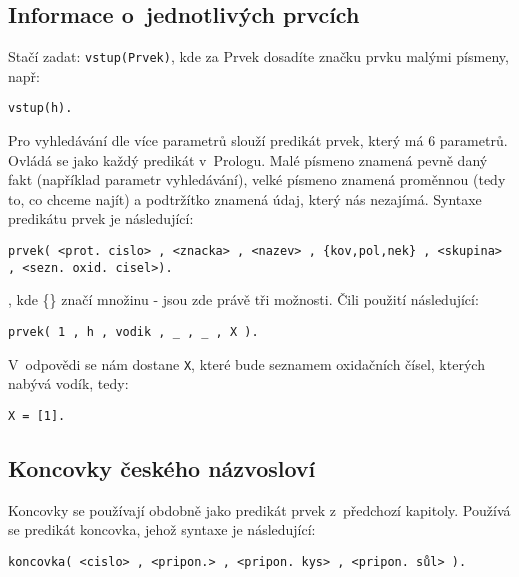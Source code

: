 \documentclass[a4paper]{article}
\begin{document}
\subsection{Informace o~jednotlivých prvcích}
Stačí zadat: \texttt{vstup(Prvek)}, kde za Prvek dosadíte značku prvku malými písmeny, např:
\begin{verbatim}
vstup(h).
\end{verbatim}
Pro vyhledávání dle více parametrů slouží predikát prvek, který má 6 parametrů. Ovládá se jako každý predikát v~Prologu. Malé písmeno znamená pevně daný fakt (například parametr vyhledávání), velké písmeno znamená proměnnou (tedy to, co chceme najít) a podtržítko znamená údaj, který nás nezajímá. Syntaxe predikátu prvek je následující:
\begin{verbatim}
prvek( <prot. cislo> , <znacka> , <nazev> , {kov,pol,nek} , <skupina> , <sezn. oxid. cisel>). 
\end{verbatim}
, kde \{\} značí množinu - jsou zde právě tři možnosti. Čili použití následující:
\begin{verbatim}
prvek( 1 , h , vodik , _ , _ , X ).
\end{verbatim}
V~odpovědi se nám dostane \texttt{X}, které bude seznamem oxidačních čísel, kterých nabývá vodík, tedy:
\begin{verbatim}
X = [1].
\end{verbatim}

\subsection{Koncovky českého názvosloví}
Koncovky se používají obdobně jako predikát prvek z~předchozí kapitoly. Používá se predikát koncovka, jehož syntaxe je následující:
\begin{verbatim}
koncovka( <cislo> , <pripon.> , <pripon. kys> , <pripon. sůl> ).
\end{verbatim}
\end{document}
